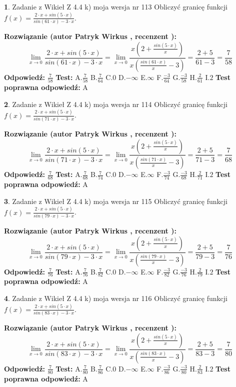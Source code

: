\documentclass[12pt, a4paper]{article}
\theoremstyle{definition} %
\newtheorem{zad}{}
\newcommand{\zadStart}[1]{\begin{zad}#1\newline}
\newcommand{\zadStop}{\end{zad}}
\newcommand{\rozwStart}[2]{\noindent \textbf{Rozwiązanie (autor #1 , recenzent #2): }\newline}
\newcommand{\rozwStop}{\newline}
\newcommand{\odpStart}{\noindent \textbf{Odpowiedź:}\newline}
\newcommand{\odpStop}{\newline}
\newcommand{\testStart}{\noindent \textbf{Test:}\newline}
\newcommand{\testStop}{\newline}
\newcommand{\kluczStart}{\noindent \textbf{Test poprawna odpowiedź:}\newline}
\newcommand{\kluczStop}{\newline}
\begin{document}
\zadStart{Zadanie z Wikieł Z 4.4 k) moja wersja nr 113}
Obliczyć granicę funkcji $f(x)=\frac{2\cdot x +sin(5\cdot x)}{sin(61\cdot x) -3\cdot x}$.
\zadStop
\rozwStart{Patryk Wirkus}{}
$$\lim\limits_{x\to 0}\frac{2\cdot x +sin(5\cdot x)}{sin(61\cdot x) -3\cdot x}
=\lim\limits_{x\to 0}\frac{x(2+\frac{sin(5\cdot x)}{x})}{x(\frac{sin(61\cdot x)}{x}-3)}
=\frac{2+5}{61-3} = \frac{7}{58}$$
\rozwStop
\odpStart
$\frac{7}{58}$
\odpStop
\testStart
A.$\frac{7}{58}$
B.$\frac{7}{64}$
C.$0$
D.$-\infty$
E.$\infty$
F.$\frac{-3}{64}$
G.$\frac{-3}{58}$
H.$\frac{2}{61}$
I.$2$
\testStop
\kluczStart
A
\kluczStop



\zadStart{Zadanie z Wikieł Z 4.4 k) moja wersja nr 114}
Obliczyć granicę funkcji $f(x)=\frac{2\cdot x +sin(5\cdot x)}{sin(71\cdot x) -3\cdot x}$.
\zadStop
\rozwStart{Patryk Wirkus}{}
$$\lim\limits_{x\to 0}\frac{2\cdot x +sin(5\cdot x)}{sin(71\cdot x) -3\cdot x}
=\lim\limits_{x\to 0}\frac{x(2+\frac{sin(5\cdot x)}{x})}{x(\frac{sin(71\cdot x)}{x}-3)}
=\frac{2+5}{71-3} = \frac{7}{68}$$
\rozwStop
\odpStart
$\frac{7}{68}$
\odpStop
\testStart
A.$\frac{7}{68}$
B.$\frac{7}{74}$
C.$0$
D.$-\infty$
E.$\infty$
F.$\frac{-3}{74}$
G.$\frac{-3}{68}$
H.$\frac{2}{71}$
I.$2$
\testStop
\kluczStart
A
\kluczStop



\zadStart{Zadanie z Wikieł Z 4.4 k) moja wersja nr 115}
Obliczyć granicę funkcji $f(x)=\frac{2\cdot x +sin(5\cdot x)}{sin(79\cdot x) -3\cdot x}$.
\zadStop
\rozwStart{Patryk Wirkus}{}
$$\lim\limits_{x\to 0}\frac{2\cdot x +sin(5\cdot x)}{sin(79\cdot x) -3\cdot x}
=\lim\limits_{x\to 0}\frac{x(2+\frac{sin(5\cdot x)}{x})}{x(\frac{sin(79\cdot x)}{x}-3)}
=\frac{2+5}{79-3} = \frac{7}{76}$$
\rozwStop
\odpStart
$\frac{7}{76}$
\odpStop
\testStart
A.$\frac{7}{76}$
B.$\frac{7}{82}$
C.$0$
D.$-\infty$
E.$\infty$
F.$\frac{-3}{82}$
G.$\frac{-3}{76}$
H.$\frac{2}{79}$
I.$2$
\testStop
\kluczStart
A
\kluczStop



\zadStart{Zadanie z Wikieł Z 4.4 k) moja wersja nr 116}
Obliczyć granicę funkcji $f(x)=\frac{2\cdot x +sin(5\cdot x)}{sin(83\cdot x) -3\cdot x}$.
\zadStop
\rozwStart{Patryk Wirkus}{}
$$\lim\limits_{x\to 0}\frac{2\cdot x +sin(5\cdot x)}{sin(83\cdot x) -3\cdot x}
=\lim\limits_{x\to 0}\frac{x(2+\frac{sin(5\cdot x)}{x})}{x(\frac{sin(83\cdot x)}{x}-3)}
=\frac{2+5}{83-3} = \frac{7}{80}$$
\rozwStop
\odpStart
$\frac{7}{80}$
\odpStop
\testStart
A.$\frac{7}{80}$
B.$\frac{7}{86}$
C.$0$
D.$-\infty$
E.$\infty$
F.$\frac{-3}{86}$
G.$\frac{-3}{80}$
H.$\frac{2}{83}$
I.$2$
\testStop
\kluczStart
A
\kluczStop
\end{document}
